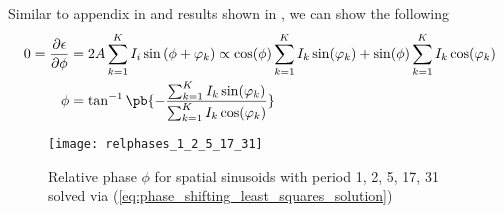 \documentclass[../writeup.tex]{subfiles}
\begin{document}
Similar to appendix in \cite{morenoEmbeddedPhaseShifting2015} and results shown in \cite{pribanicEfficientMultiplePhase2010,morenoEmbeddedPhaseShifting2015}, we can show the following
\begin{align}
    0
        = \frac{\partial \epsilon}{\partial \phi}
        &= 2A \sum_{k=1}^K I_i\sin \left( \phi + \varphi_k \right)
        \propto \cos(\phi) \sum_{k=1}^K I_k \sin(\varphi_k) + \sin(\phi) \sum_{k=1}^{K} I_k \cos(\varphi_k) 
        \nonumber \\
    \phi
        &= \tan^{-1}\pb{
            -
            \frac{
                \sum_{k=1}^K I_k \sin(\varphi_k)
            }{
                \sum_{k=1}^K I_k \cos(\varphi_k)
            }
        }
        \label{eq:phase_shifting_least_squares_solution}
\end{align}
\begin{figure}[h!]
    \begin{center}
        \texttt{[image: relphases\_1\_2\_5\_17\_31]}
    \end{center}
    \caption{Relative phase $\phi$ for spatial sinusoids with period 1, 2, 5, 17, 31 solved via (\ref{eq:phase_shifting_least_squares_solution})}
    \label{fig:relative_phase_solution}
\end{figure}
\end{document}
